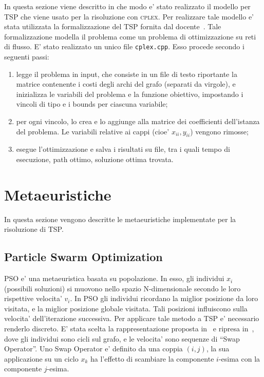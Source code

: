 \documentclass[
12pt, %
a4paper, %
oneside, %
headinclude,footinclude, %
BCOR5mm, %
]{scrartcl}
\begin{document}
In questa sezione viene descritto in che modo e' stato realizzato il modello per TSP che viene usato per la risoluzione con \textsc{cplex}. Per realizzare tale modello e' stata utilizzata la formalizzazione del TSP fornita dal docente~\cite{luigitraccia1}. Tale formalizzazione modella il problema come un problema di ottimizzazione su reti di flusso. E' stato realizzato un unico file \texttt{cplex.cpp}. Esso procede secondo i seguenti passi:
\begin{enumerate}
 \item legge il problema in input, che consiste in un file di testo riportante la matrice contenente i costi degli archi del grafo (separati da virgole), e inizializza le variabili del problema e la funzione obiettivo, impostando i vincoli di tipo e i bounds per ciascuna variabile;
 \item per ogni vincolo, lo crea e lo aggiunge alla matrice dei coefficienti dell'istanza del problema. Le variabili relative ai cappi (cioe' $x_{ii}, y_{ii}$) vengono rimosse;
 \item esegue l'ottimizzazione e salva i risultati su file, tra i quali tempo di esecuzione, path ottimo, soluzione ottima trovata.
\end{enumerate}


\section{Metaeuristiche} \label{sec:eur}
In questa sezione vengono descritte le metaeuristiche implementate per la risoluzione di TSP. 

\subsection{Particle Swarm Optimization}

PSO e' una metaeuristica basata su popolazione. In esso, gli individui $x_i$ (possibili soluzioni) si muovono nello spazio N-dimensionale secondo le loro rispettive velocita' $v_i$. In PSO gli individui ricordano la miglior posizione da loro visitata, e la miglior posizione globale visitata. Tali posizioni influiscono sulla velocita' dell'iterazione successiva. Per applicare tale metodo a TSP e' necessario renderlo discreto. E' stata scelta la rappresentazione proposta in~\cite{1259748} e ripresa in~\cite{shi2007particle}, dove gli individui sono cicli sul grafo, e le velocita' sono sequenze di ``Swap Operator''. Uno Swap Operator e' definito da una coppia $(i, j)$, la sua applicazione su un ciclo $x_k$ ha l'effetto di scambiare la componente $i$-esima con la componente $j$-esima. 
\end{document}
